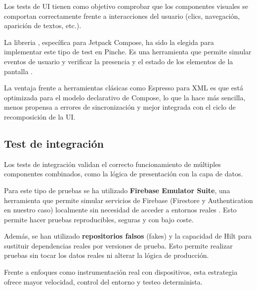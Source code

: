 Los tests de UI tienen como objetivo comprobar que los componentes visuales se comportan correctamente frente a interacciones del usuario (clics, navegación, aparición de textos, etc.).

La libreria , específica para Jetpack Compose, ha sido la elegida para implementar este tipo de test en Pinche. Es una herramienta que permite simular eventos de usuario y verificar la presencia y el estado de los elementos de la pantalla \cite{android-testing}.

La ventaja frente a herramientas clásicas como Espresso para XML es que está optimizada para el modelo declarativo de Compose, lo que la hace más sencilla, menos propensa a errores de sincronización y mejor integrada con el ciclo de recomposición de la UI.

\subsection{Test de integración}

Los tests de integración validan el correcto funcionamiento de múltiples componentes combinados, como la lógica de presentación con la capa de datos.

Para este tipo de pruebas se ha utilizado \textbf{Firebase Emulator Suite}, una herramienta que permite simular servicios de Firebase (Firestore y Authentication en nuestro caso) localmente sin necesidad de acceder a entornos reales \cite{firebase-emulator}. Esto permite hacer pruebas reproducibles, seguras y con bajo coste.

Además, se han utilizado \textbf{repositorios falsos} (fakes) y la capacidad de Hilt para sustituir dependencias reales por versiones de prueba. Esto permite realizar pruebas sin tocar los datos reales ni alterar la lógica de producción.

Frente a enfoques como instrumentación real con dispositivos, esta estrategia ofrece mayor velocidad, control del entorno y testeo determinista.





